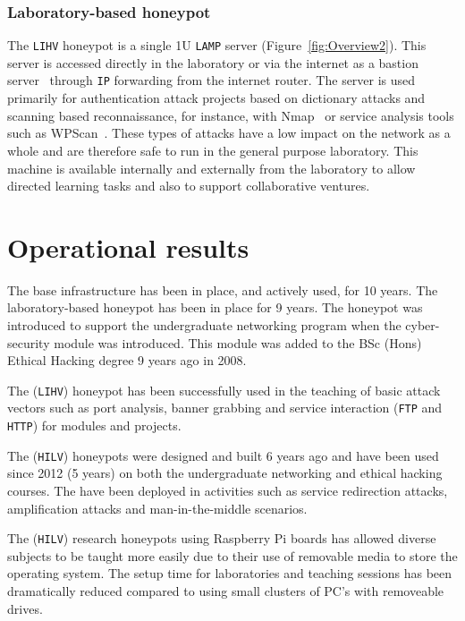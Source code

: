 \subsubsection{Laboratory-based honeypot}
The \texttt{LIHV} honeypot is a single 1U \texttt{LAMP} server (Figure~\ref{fig:Overview2}). This server is accessed directly in the laboratory or via the internet as a bastion server~\cite{MB:05} through \texttt{IP} forwarding from the internet router. The server is used primarily for authentication attack projects based on dictionary attacks and scanning based reconnaissance, for instance, with Nmap~\cite{GFL:09} or service analysis tools such as WPScan~\cite{WT:17}. These types of attacks have a low impact on the network as a whole and are therefore safe to run in the general purpose laboratory. This machine is available internally and externally from the laboratory to allow directed learning tasks and also to support collaborative ventures.

\section{Operational results}\label{Results}

The base infrastructure has been in place, and actively used, for 10 years. The laboratory-based honeypot has been in place for 9 years. The honeypot was introduced to support the undergraduate networking program when the cyber-security module was introduced. This module was added to the BSc (Hons) Ethical Hacking degree 9 years ago in 2008.

The (\texttt{LIHV}) honeypot has been successfully used in the teaching of basic attack vectors such as port analysis, banner grabbing and service interaction (\texttt{FTP} and \texttt{HTTP}) for modules and projects. 

The (\texttt{HILV}) honeypots were designed and built 6 years ago and have been used since 2012 (5 years) on both the undergraduate networking and ethical hacking courses. The have been deployed in activities such as service redirection attacks, amplification attacks and man-in-the-middle scenarios.

The (\texttt{HILV}) research honeypots using Raspberry Pi boards has allowed diverse subjects to be taught more easily due to their use of removable media to store the operating system. The setup time for laboratories and teaching sessions has been dramatically reduced compared to using small clusters of PC's with removeable drives. 

